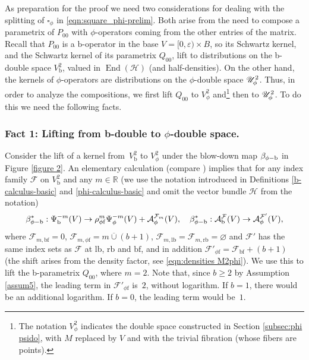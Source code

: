 \documentclass[11pt]{article}
\numberwithin{equation}{section}
\newcommand{\phib}{{\phi\textup{-}\bb}}
\theoremstyle{plain}
\theoremstyle{definition}
\newcommand{\R}{{\mathbb{R}}}
\newcommand{\Hmath}{{\mathscr{H}}}
\newcommand\calA{{\mathcal A}}
\newcommand\calF{{\mathcal F}}
\newcommand{\phif}{{\phi\mathrm{f}}}
\newcommand{\lf}{{\mathrm{lb}}}
\newcommand{\rf}{{\mathrm{rb}}}
\newcommand{\bb}{{\mathrm{b}}}
\newcommand{\bbf}{{\mathrm{bf}}}
\DeclareMathOperator{\End}{End}
\newcommand{\ocup}{\mathbin{\overline{\cup}}}
\begin{document}
As preparation for the proof we need two considerations for dealing with the splitting of $\square_\phi$ in
\eqref{eqn:square_phi-prelim}. Both arise from the need to compose a parametrix of $P_{00}$ with $\phi$\nobreakdash-operators coming from the other entries of the matrix. Recall that $P_{00}$ is a $\bb$\nobreakdash-operator in the base $V=[0,\varepsilon) \times B$, so its
Schwartz kernel, and the Schwartz kernel of its parametrix $Q_{00}$, lift to distributions on the b-double space
$V^2_\bb$, valued in $\End(\mathscr{H})$ (and half-densities). On the other hand, the kernels of $\phi$-operators are distributions on the $\phi$-double space $\mathscr{U}^2_\phi$. Thus, in order to analyze the compositions, we first lift $Q_{00}$ to $V^2_\phi$ and\footnote{The notation $V^2_\phi$ indicates the double space constructed in Section \ref{subsec:phi psido}, with $M$ replaced by $V$ and with the trivial fibration (whose fibers are points).} then to $\mathscr{U}^2_\phi$. To do this we need the following facts.

\subsubsection*{Fact 1: Lifting from b-double to $\phi$-double space.}

Consider the lift of a kernel from~$V^2_\bb$ to $V^2_\phi$ under the blow-down
map $\beta_{\phib}$ in Figure \ref{figure 2}. An elementary calculation
(compare \cite[Prop.\,1]{grieser-para}) implies that for any index
family $\calF$ on $V^2_\bb$ and any $m\in\R$ (we use the notation introduced in
Definitions \ref{b-calculus-basic} and \ref{phi-calculus-basic} and omit the vector bundle $\Hmath$ from the notation)
\begin{equation}
\label{eqn:lifting}
\beta_{\phib}^*: \Psi_\bb^{-m}(V) \to \rho_\phif^m\Psi_\phi^{-m}(V) +\calA^{\calF_m}_\phi(V),
\quad \beta_{\phib}^*: \calA^{\calF}_\bb(V) \to \calA^{\calF'}_\phi(V),
\end{equation}
where $\calF_{m,\bbf}=0$, $\calF_{m,\phif}=m \ocup (b+1)$, $\calF_{m,\lf}=\calF_{m,\rf}=\varnothing$
and $\calF'$ has the same index sets as $\calF$ at $\lf$, $\rf$ and $\bbf$, and in addition
$\calF'_\phif = \calF_\bbf+(b+1)$ (the shift arises from the density factor, see \eqref{eqn:densities M2phi}).
We use this to lift the b-parametrix $Q_{00}$, where $m=2$. Note that, since $b\geq2$ by Assumption \ref{assum5}, the leading term in $\calF'_\phif$ is~$2$, without logarithm. If $b\!=\!1$, there would be an additional logarithm. If $b\!=\!0$, the leading term would be~$1$.
\end{document}
